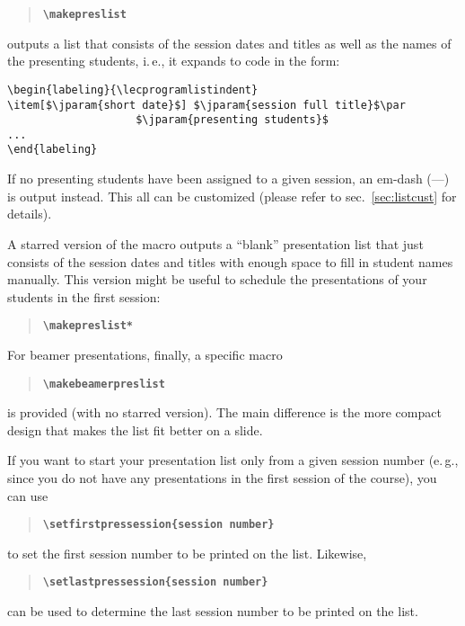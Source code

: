 \documentclass[english]{article}
\newcommand*\jmacro[1]{\textbf{\texttt{#1}}}
\newcommand*\jcsmacro[1]{\jmacro{\textbackslash{#1}}}
\newcommand*\jparam[1]{\angus #1\angud}
\begin{document}
\begin{quote}
\jcsmacro{makepreslist}
\end{quote}
outputs a list that consists of the session dates and titles as well as the names of the
presenting students, i.\,e., it expands to code in the form:
\begin{lstlisting}[language={[LaTeX]TeX},basicstyle={\small\ttfamily},
                   escapechar=\$,frame=single]
\begin{labeling}{\lecprogramlistindent}
\item[$\jparam{short date}$] $\jparam{session full title}$\par
                    $\jparam{presenting students}$
...
\end{labeling}
\end{lstlisting}
If no presenting students have been assigned to a given session,
an em-dash (---) is output instead.
This all can be customized (please refer to sec.~\ref{sec:listcust} for details).

A starred version of the macro outputs a ``blank'' presentation list that just consists of
the session dates and titles with enough space to fill in student names manually.
This version might be useful to schedule the presentations of your students in the first
session:

\begin{quote}
\jcsmacro{makepreslist*}
\end{quote}
For beamer presentations, finally, a specific macro

\begin{quote}
\jcsmacro{makebeamerpreslist}
\end{quote}
is provided (with no starred version). The main difference is the more compact design that makes
the list fit better on a slide.

If you want to start your presentation list only from a given session number (e.\,g., since you
do not have any presentations in the first session of the course), you can use

\begin{quote}
\jcsmacro{setfirstpressession\{\jparam{session number}\}}
\end{quote}
to set the first session number to be printed on the list. Likewise, 
\begin{quote}
\jcsmacro{setlastpressession\{\jparam{session number}\}}
\end{quote}
can be used to determine the last session number to be printed on the list.
\end{document}
